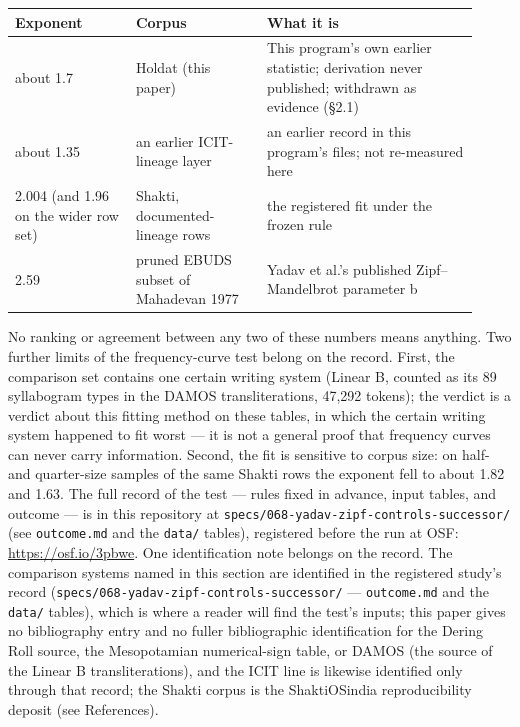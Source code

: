 \documentclass[11pt]{article}
\begin{document}
\begin{center}
\begin{tabular}{@{}p{0.24\linewidth} p{0.26\linewidth} p{0.42\linewidth}@{}}
\toprule
Exponent & Corpus & What it is \\
\midrule
about 1.7 & Holdat (this paper) & This program's own earlier statistic; derivation never published; withdrawn as evidence (§2.1) \\
about 1.35 & an earlier ICIT-lineage layer & an earlier record in this program's files; not re-measured here \\
2.004 (and 1.96 on the wider row set) & Shakti, documented-lineage rows & the registered fit under the frozen rule \\
2.59 & pruned EBUDS subset of Mahadevan 1977 & Yadav et al.'s published Zipf--Mandelbrot parameter b \\
\bottomrule
\end{tabular}
\end{center}

No ranking or agreement between any two of these numbers means anything. Two further limits of the frequency-curve test belong on the record. First, the comparison set contains one certain writing system (Linear B, counted as its 89 syllabogram types in the DAMOS transliterations, 47,292 tokens); the verdict is a verdict about this fitting method on these tables, in which the certain writing system happened to fit worst --- it is not a general proof that frequency curves can never carry information. Second, the fit is sensitive to corpus size: on half- and quarter-size samples of the same Shakti rows the exponent fell to about 1.82 and 1.63. The full record of the test --- rules fixed in advance, input tables, and outcome --- is in this repository at \texttt{specs/068-yadav-zipf-controls-successor/} (see \texttt{outcome.md} and the \texttt{data/} tables), registered before the run at OSF: \url{https://osf.io/3pbwe}. One identification note belongs on the record. The comparison systems named in this section are identified in the registered study's record (\texttt{specs/068-yadav-zipf-controls-successor/} --- \texttt{outcome.md} and the \texttt{data/} tables), which is where a reader will find the test's inputs; this paper gives no bibliography entry and no fuller bibliographic identification for the Dering Roll source, the Mesopotamian numerical-sign table, or DAMOS (the source of the Linear B transliterations), and the ICIT line is likewise identified only through that record; the Shakti corpus is the ShaktiOSindia reproducibility deposit (see References).
\end{document}
